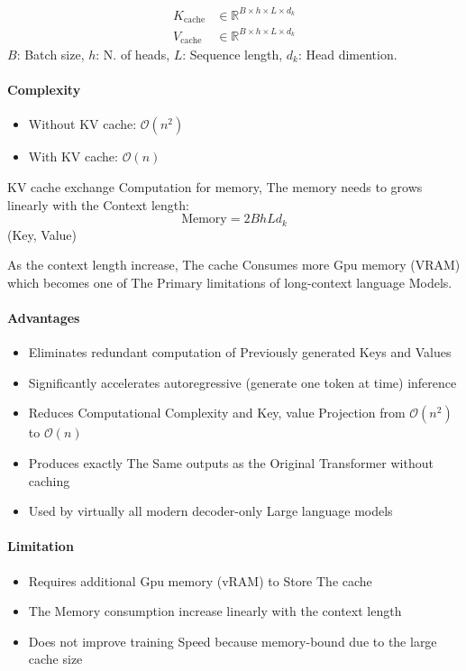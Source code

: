 \begin{align*}
K_{\text{cache}} &\in \mathbb{R}^{B \times h \times L \times d_k} \\
V_{\text{cache}} &\in \mathbb{R}^{B \times h \times L \times d_k}
\end{align*}
$B$: Batch size, $h$: N. of heads, $L$: Sequence length, $d_k$: Head dimention.

\paragraph{Complexity}
\begin{itemize}
    \item Without KV cache: $\mathcal{O}(n^2)$
    \item With KV cache: $\mathcal{O}(n)$
\end{itemize}

KV cache exchange Computation for memory, The memory needs to grows linearly with the Context length:
\begin{equation}
\text{Memory} = 2 B h L d_k
\end{equation}
(Key, Value)

As the context length increase, The cache Consumes more Gpu memory (VRAM) which becomes one of The Primary limitations of long-context language Models.

\paragraph{Advantages}
\begin{itemize}
    \item Eliminates redundant computation of Previously generated Keys and Values
    \item Significantly accelerates autoregressive (generate one token at time) inference
    \item Reduces Computational Complexity and Key, value Projection from $\mathcal{O}(n^2)$ to $\mathcal{O}(n)$
    \item Produces exactly The Same outputs as the Original Transformer without caching
    \item Used by virtually all modern decoder-only Large language models
\end{itemize}

\paragraph{Limitation}
\begin{itemize}
    \item Requires additional Gpu memory (vRAM) to Store The cache
    \item The Memory consumption increase linearly with the context length
    \item Does not improve training Speed because memory-bound due to the large cache size
\end{itemize}

